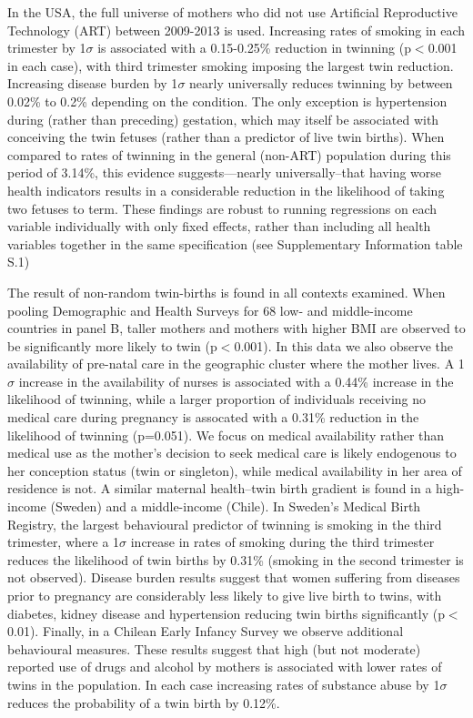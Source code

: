 \documentclass{nature}
\begin{document}
\begin{linenumbers}
In the USA, the full universe of mothers who did not use Artificial Reproductive Technology (ART) between 2009-2013 is used.  Increasing rates of smoking in each trimester by 1$\sigma$ is associated with a 0.15-0.25\% reduction in twinning (p$<$0.001 in each case), with third trimester smoking imposing the largest twin reduction.  Increasing disease burden by 1$\sigma$ nearly universally reduces twinning by between 0.02\% to 0.2\% depending on the condition.  The only exception is hypertension during (rather than preceding) gestation, which may itself be associated with conceiving the twin fetuses (rather than a predictor of live twin births). When compared to rates of twinning in the general (non-ART) population during this period of 3.14\%, this evidence suggests---nearly universally--that having worse health indicators results in a considerable reduction in the likelihood of taking two fetuses to term.  These findings are robust to running regressions on each variable individually with only fixed effects, rather than including all health variables together in the same specification (see Supplementary Information table S.1)  


The result of non-random twin-births is found in all contexts examined. When pooling Demographic and Health Surveys for 68 low- and middle-income countries in panel B, taller mothers and mothers with higher BMI are observed to be significantly more likely to twin (p$<$0.001).  In this data we also observe the availability of pre-natal care in the geographic cluster where the mother lives.  A 1$\sigma$ increase in the availability of nurses is associated with a 0.44\% increase in the likelihood of twinning, while a larger proportion of individuals receiving no medical care during pregnancy is assocated with a 0.31\% reduction in the likelihood of twinning (p=0.051).  We focus on medical availability rather than medical use as the mother's decision to seek medical care is likely endogenous to her conception status (twin or singleton), while medical availability in her area of residence is not.  A similar maternal health--twin birth gradient is found in a high-income (Sweden) and a middle-income (Chile).  In Sweden's Medical Birth Registry, the largest behavioural predictor of twinning is smoking in the third trimester, where a 1$\sigma$ increase in rates of smoking during the third trimester reduces the likelihood of twin births by 0.31\% (smoking in the second trimester is not observed).  Disease burden results suggest that women suffering from diseases prior to pregnancy are considerably less likely to give live birth to twins, with diabetes, kidney disease and hypertension reducing twin births significantly (p$<$0.01).  Finally, in a Chilean Early Infancy Survey we observe additional behavioural measures.  These results suggest that high (but not moderate) reported use of drugs and alcohol by mothers is associated with lower rates of twins in the population.  In each case increasing rates of substance abuse by 1$\sigma$ reduces the probability of a twin birth by 0.12\%.


\end{linenumbers}
\end{document}
